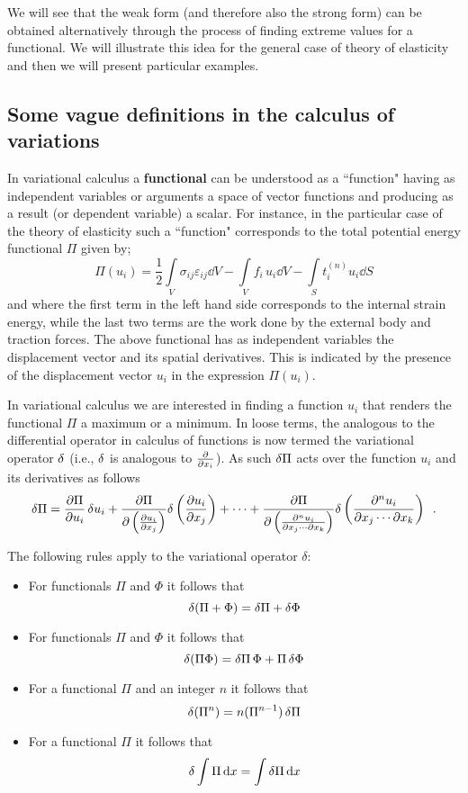 We will see that the weak form (and therefore also the strong form) can be obtained alternatively through the process of finding extreme values for a functional. We will illustrate this idea for the general case of theory of elasticity and then we will present particular examples.

\subsection*{Some vague definitions in the calculus of variations}
In variational calculus a {\bf functional} can be understood as a ``function" having as independent variables or arguments a space of vector functions and producing as a result (or dependent variable) a scalar. For instance, in the particular case of the theory of elasticity such a ``function" corresponds to the total potential energy functional $\Pi$ given by;
\begin{equation}\label{eq:Potential}
    \Pi(u_i) = \frac{1}{2}\int\limits_V \sigma_{ij}\varepsilon_{ij}\dd{V}  - \int\limits_V f_i\, u_i\dd{V}  - \int\limits_S t_i^{(n)} u_i\dd{S}
\end{equation}
and where the first term in the left hand side corresponds to the internal strain energy, while the last two terms are the work done by the external body and traction forces. The above functional has as independent variables the displacement vector and its spatial derivatives. This is indicated by the presence of the displacement vector $u_i$ in the expression $\Pi(u_i)$.

In variational calculus we are interested in finding a function $u_i$ that renders the functional $\Pi$ a maximum or a minimum. In loose terms, the analogous to the differential operator in calculus of functions is now termed the variational operator $\var$ (i.e., $\var$ is analogous to $\pdv{x_i}$). As such $\var{\Pi}$ acts over the function $u_i$ and its derivatives as follows
\[\var{\Pi}  = \pdv{\Pi}{u_i}\var{u_i} + \pdv{\Pi}{\left( \pdv{u_i}{x_j}\right)} \delta\left(\pdv{u_i}{x_j}\right) + \cdots + \pdv{\Pi}{\left( \pdv{^{n}u_i}{x_j \cdots \partial x_k}\right)} \delta\left( \pdv{^{n}u_i}{x_j \cdots \partial x_k}\right) \enspace .\]

The following rules apply to the variational operator $\delta$:
\begin{itemize}
\item For functionals $\Pi$ and $\Phi$ it follows that \[\var(\Pi  + \Phi) = \var{\Pi}  + \var{\Phi}\]
\item For functionals $\Pi$ and $\Phi$ it follows that \[\var(\Pi \Phi ) = \var{\Pi} \Phi  + \Pi \var{\Phi}\]
\item For a functional $\Pi$ and an integer $n$ it follows that \[\var(\Pi^n) = n(\Pi^{n - 1})\var{\Pi}\]
\item For a functional $\Pi$ it follows that \[\var{\int \Pi \dd{x}}  = \int \var{\Pi} \dd{x} \]
\end{itemize}

